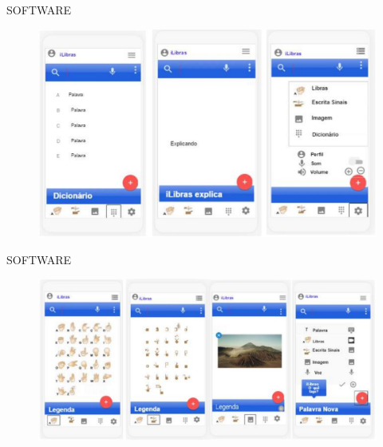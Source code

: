 \documentclass{Alexandre}
\begin{document}
\begin{frame}{SOFTWARE}
    
    \begin{figure}
        \includegraphics[scale = 0.3]{Figuras/Aplicativo.jpg}
    \end{figure}

\end{frame}


\begin{frame}{SOFTWARE}
    
    \begin{figure}
        \includegraphics[scale = 0.25]{Figuras/Gestos.jpg}
    \end{figure}

\end{frame}
\end{document}
